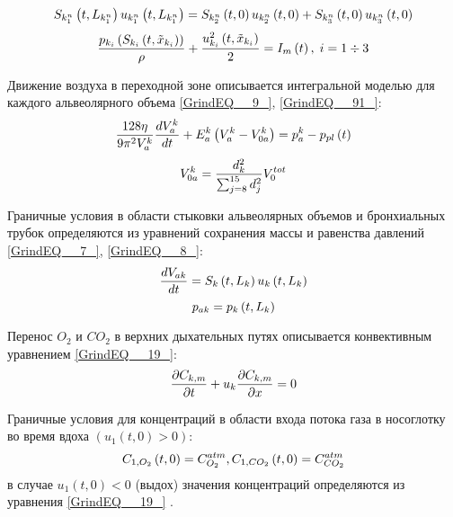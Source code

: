 \begin{equation} 
S_{k_{1}^{n} } \left(t,L_{k_{1}^{n} } \right)u_{k_{1}^{n} } \left(t,L_{k_{1}^{n} } \right)=S_{k_{2}^{n} } \left(t,0\right)u_{k_{2}^{n} } \left(t,0\right)+S_{k_{3}^{n} } \left(t,0\right)u_{k_{3}^{n} } \left(t,0\right)\notag
\end{equation} 
\begin{equation} 
\frac{p_{k_{i} } \left(S_{k_{i} } \left(t,\tilde{x}_{k_{i} } \right)\right)}{\rho } +\frac{u_{k_{i} }^{2} \left(t,\tilde{x}_{k_{i} } \right)}{2} =I_{m} \left(t\right),\; i=1\div 3\notag 
\end{equation} 

Движение воздуха в переходной зоне описывается интегральной моделью для каждого альвеолярного объема \eqref{GrindEQ__9_}, \eqref{GrindEQ__91_}:
\begin{equation} 
\frac{128\eta }{9\pi ^{2} V_{a}^{k} } \frac{dV_{a}^{k} }{dt} +E_{a}^{k} \left(V_{a}^{k} -V_{0a}^{k} \right)=p_{a}^{k} -p_{pl} \left(t\right) \notag
\end{equation} 
\begin{equation} 
V_{0a}^{k} = \frac{d_{k}^{2}}{\sum_{j=8}^{15} d^{2}_{j}}V_{0}^{tot} \notag
\end{equation}

Граничные условия в области стыковки альвеолярных объемов и бронхиальных трубок определяются из уравнений сохранения массы и равенства давлений \eqref{GrindEQ__7_}, \eqref{GrindEQ__8_}:
\begin{equation} 
\frac{dV_{ak} }{dt} =S_{k} \left(t,L_{k} \right)u_{k} \left(t,L_{k} \right)\notag  
\end{equation} 
\begin{equation} 
p_{ak} =p_{k} \left(t,L_{k} \right)\notag 
\end{equation} 

Перенос $O_{2}$ и $CO_{2}$ в верхних дыхательных путях описывается конвективным уравнением \eqref{GrindEQ__19_}: 
\begin{equation}
\frac{\partial C_{k,m} }{\partial t} +u_{k} \frac{\partial C_{k,m} }{\partial x} =0\notag 
\end{equation} 

Граничные условия для концентраций  в области входа потока газа в носоглотку во время вдоха $\left(u_{1} \left(t,0\right)>0\right)$: 
\begin{equation} 
C_{1,O_{2} } \left(t,0\right)=C_{O_{2} }^{atm} , C_{1,CO_{2} } \left(t,0\right)=C_{CO_{2} }^{atm} \notag
\end{equation} 
в случае $u_{1} \left(t,0\right)<0$ (выдох) значения концентраций определяются из уравнения \eqref{GrindEQ__19_} .

